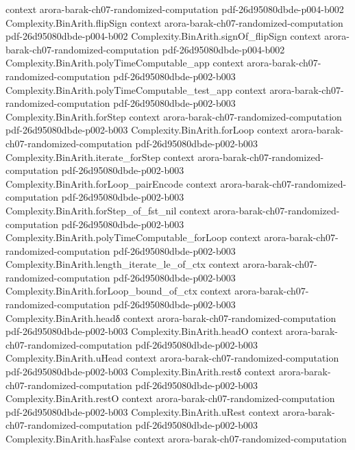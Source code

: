 \begin{theorem}
  {context}
  {arora-barak-ch07-randomized-computation}
  {pdf-26d95080dbde-p004-b002}
\proofstep
  {Complexity.BinArith.flipSign}
  {context}
  {arora-barak-ch07-randomized-computation}
  {pdf-26d95080dbde-p004-b002}
\proofstep
  {Complexity.BinArith.signOf_flipSign}
  {context}
  {arora-barak-ch07-randomized-computation}
  {pdf-26d95080dbde-p004-b002}
\proofstep
  {Complexity.BinArith.polyTimeComputable_app}
  {context}
  {arora-barak-ch07-randomized-computation}
  {pdf-26d95080dbde-p002-b003}
\proofstep
  {Complexity.BinArith.polyTimeComputable_test_app}
  {context}
  {arora-barak-ch07-randomized-computation}
  {pdf-26d95080dbde-p002-b003}
\proofstep
  {Complexity.BinArith.forStep}
  {context}
  {arora-barak-ch07-randomized-computation}
  {pdf-26d95080dbde-p002-b003}
\proofstep
  {Complexity.BinArith.forLoop}
  {context}
  {arora-barak-ch07-randomized-computation}
  {pdf-26d95080dbde-p002-b003}
\proofstep
  {Complexity.BinArith.iterate_forStep}
  {context}
  {arora-barak-ch07-randomized-computation}
  {pdf-26d95080dbde-p002-b003}
\proofstep
  {Complexity.BinArith.forLoop_pairEncode}
  {context}
  {arora-barak-ch07-randomized-computation}
  {pdf-26d95080dbde-p002-b003}
\proofstep
  {Complexity.BinArith.forStep_of_fst_nil}
  {context}
  {arora-barak-ch07-randomized-computation}
  {pdf-26d95080dbde-p002-b003}
\proofstep
  {Complexity.BinArith.polyTimeComputable_forLoop}
  {context}
  {arora-barak-ch07-randomized-computation}
  {pdf-26d95080dbde-p002-b003}
\proofstep
  {Complexity.BinArith.length_iterate_le_of_ctx}
  {context}
  {arora-barak-ch07-randomized-computation}
  {pdf-26d95080dbde-p002-b003}
\proofstep
  {Complexity.BinArith.forLoop_bound_of_ctx}
  {context}
  {arora-barak-ch07-randomized-computation}
  {pdf-26d95080dbde-p002-b003}
\proofstep
  {Complexity.BinArith.headδ}
  {context}
  {arora-barak-ch07-randomized-computation}
  {pdf-26d95080dbde-p002-b003}
\proofstep
  {Complexity.BinArith.headO}
  {context}
  {arora-barak-ch07-randomized-computation}
  {pdf-26d95080dbde-p002-b003}
\proofstep
  {Complexity.BinArith.uHead}
  {context}
  {arora-barak-ch07-randomized-computation}
  {pdf-26d95080dbde-p002-b003}
\proofstep
  {Complexity.BinArith.restδ}
  {context}
  {arora-barak-ch07-randomized-computation}
  {pdf-26d95080dbde-p002-b003}
\proofstep
  {Complexity.BinArith.restO}
  {context}
  {arora-barak-ch07-randomized-computation}
  {pdf-26d95080dbde-p002-b003}
\proofstep
  {Complexity.BinArith.uRest}
  {context}
  {arora-barak-ch07-randomized-computation}
  {pdf-26d95080dbde-p002-b003}
\proofstep
  {Complexity.BinArith.hasFalse}
  {context}
  {arora-barak-ch07-randomized-computation}

\end{theorem}
